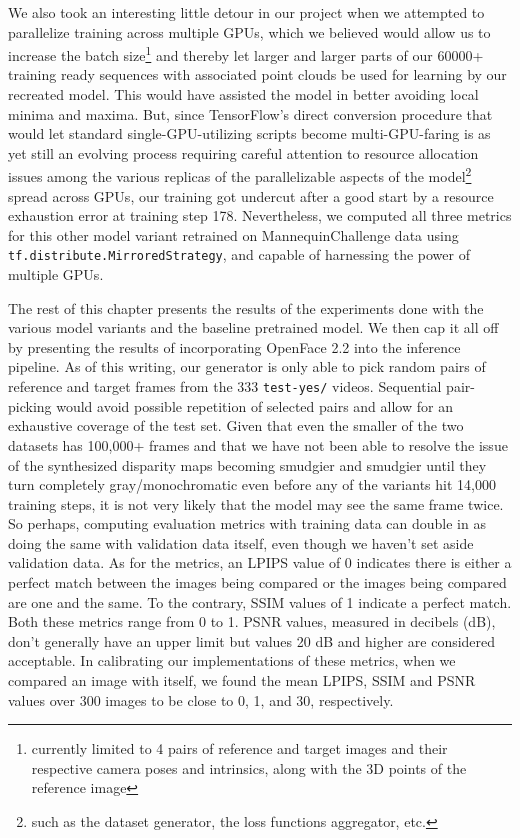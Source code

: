 We also took an interesting little detour in our project when we attempted to parallelize training across multiple GPUs, which we believed would allow us to increase the batch size\footnote{currently limited to 4 pairs of reference and target images and their respective camera poses and intrinsics, along with the 3D points of the reference image} and thereby let larger and larger parts of our 60000+ training ready sequences with associated point clouds be used for learning by our recreated model. This would have assisted the model in better avoiding local minima and maxima. But, since TensorFlow's direct conversion procedure that would let standard single-GPU-utilizing scripts become multi-GPU-faring is as yet still an evolving process requiring careful attention to resource allocation issues among the various replicas of the parallelizable aspects of the model\footnote{such as the dataset generator, the loss functions aggregator, etc.} spread across GPUs, our training got undercut after a good start by a resource exhaustion error at training step 178. Nevertheless, we computed all three metrics for this other model variant retrained on MannequinChallenge data using \texttt{tf.distribute.MirroredStrategy}, and capable of harnessing the power of multiple GPUs.

The rest of this chapter presents the results of the experiments done with the various model variants and the baseline pretrained model. We then cap it all off by presenting the results of incorporating OpenFace 2.2 into the inference pipeline. As of this writing, our generator is only able to pick random pairs of reference and target frames from the 333 \texttt{test-yes/} videos. Sequential pair-picking would avoid possible repetition of selected pairs and allow for an exhaustive coverage of the test set. Given that even the smaller of the two datasets has 100,000+ frames and that we have not been able to resolve the issue of the synthesized disparity maps becoming smudgier and smudgier until they turn completely gray/monochromatic even before any of the variants hit 14,000 training steps, it is not very likely that the model may see the same frame twice. So perhaps, computing evaluation metrics with training data can double in as doing the same with validation data itself, even though we haven't set aside validation data. As for the metrics, an LPIPS value of 0 indicates there is either a perfect match between the images being compared or the images being compared are one and the same. To the contrary, SSIM values of 1 indicate a perfect match. Both these metrics range from 0 to 1. PSNR values, measured in decibels (dB), don't generally have an upper limit but values 20 dB and higher are considered acceptable. In calibrating our implementations of these metrics, when we compared an image with itself, we found the mean LPIPS, SSIM and PSNR values over 300 images to be close to 0, 1, and 30, respectively.

